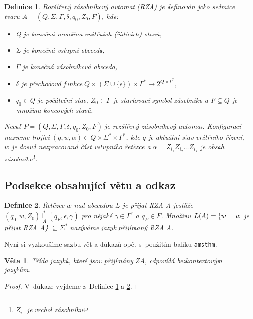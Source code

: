 \documentclass[draft, 11pt, a4paper,twocolumn]{article}
\newtheorem{definition}{Definice}
\newtheorem{sentence}{Věta}
\begin{document}
\begin{definition}\label{def:1}
\emph{Rozšířený zásobníkový automat} (RZA) je definován jako sedmice tvaru $A=(Q,\Sigma,\Gamma,\delta,q_0,Z_0,F)$, kde:
    \begin{itemize}
        \item Q je konečná množina \emph{vnitřních (řídicích) stavů},
        \item $\Sigma$ je konečná \emph{vstupní abeceda},
        \item $\Gamma$ je konečná \emph{zásobníková abeceda},
        \item $\delta$ je \emph{přechodová funkce} $Q \times (\Sigma\cup\{\epsilon\}) \times \Gamma^* \rightarrow 2^{Q\times\Gamma^*}$,
        \item $q_0 \in Q$ je \emph{počáteční stav}, $Z_0 \in \Gamma$ \emph{je startovací symbol zásobníku} a  $F \subseteq Q$ je množina \emph{koncových stavů}.
    \end{itemize}
    
    \emph{Nechť} $P=(Q,\Sigma,\Gamma,\delta,q_0,Z_0,F)$ \emph{je rozšířený zásobníkový automat}. Konfigurací \emph{nazveme trojici} $(q,w,\alpha)\in Q\times\Sigma^*\times\Gamma^*$, \emph{kde} $q$ \emph{je aktuální stav vnitřního řízení}, $w$ \emph{je dosud nezpracovaná část vstupního řetězce a} $\alpha=Z_{i_1}Z_{i_2}\ldots Z_{i_k}$ \emph{je obsah zásobníku\footnote{$Z_{i_1}$ je vrchol zásobníku}}.
\end{definition}

\subsection{Podsekce obsahující větu a odkaz}
    \begin{definition}\label{def:2}
    \emph{Řetězec} $w$ \emph{nad abecedou} $\Sigma$ \emph{je přijat RZA} $A$ jestliže $(q_0, w, Z_0)\overset{*}{\underset{A}\vdash}(q_F, \epsilon, \gamma)$ pro nějaké $\gamma \in \Gamma^*$ a $q_F \in F$. Množinu $L(A) = \{w\hspace{2mm}|\hspace{2mm}w$ je přijat RZA A\} $\subseteq \Sigma^*$ nazýváme \emph{jazyk přijímaný RZA} $A$.
    \end{definition}
    
    Nyní si vyzkoušíme sazbu vět a důkazů opět s~použitím balíku \verb|amsthm|.
    \begin{sentence}
    Třída jazyků, které jsou přijímány ZA, odpovídá \emph{bezkontextovým jazykům}.
    \end{sentence}
    \begin{proof}
        V~důkaze vyjdeme z~Definice \ref{def:1} a \ref{def:2}.
    \end{proof}
    
\end{document}
